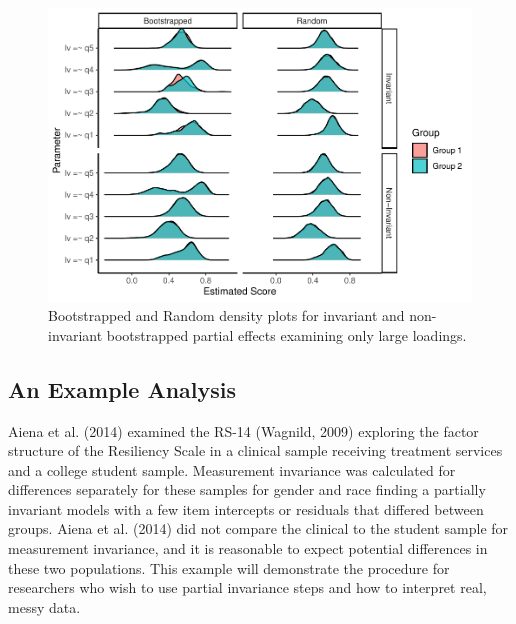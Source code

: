 \documentclass[
  man]{apa7}
\begin{document}
\begin{figure}
\centering
\includegraphics{manuscript_files/figure-latex/density-large-loading-pic-1.pdf}
\caption{\label{fig:density-large-loading-pic}Bootstrapped and Random density plots for invariant and non-invariant bootstrapped partial effects examining only large loadings.}
\end{figure}

\hypertarget{an-example-analysis}{%
\subsection{An Example Analysis}\label{an-example-analysis}}

Aiena et al. (2014) examined the RS-14 (Wagnild, 2009) exploring the factor structure of the Resiliency Scale in a clinical sample receiving treatment services and a college student sample. Measurement invariance was calculated for differences separately for these samples for gender and race finding a partially invariant models with a few item intercepts or residuals that differed between groups. Aiena et al. (2014) did not compare the clinical to the student sample for measurement invariance, and it is reasonable to expect potential differences in these two populations. This example will demonstrate the procedure for researchers who wish to use partial invariance steps and how to interpret real, messy data.

\small
\end{document}
